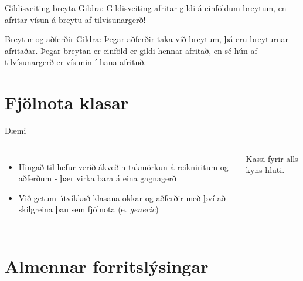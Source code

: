 \documentclass{beamer}
\begin{document}
\begin{frame}[fragile]{Gildisveiting breyta}
	Gildra: Gildisveiting afritar gildi á einföldum breytum, en afritar vísun á breytu af tilvísunargerð!

\end{frame}

\begin{frame}{Breytur og aðferðir}
	Gildra: Þegar aðferðir taka við breytum, þá eru breyturnar afritaðar. Þegar breytan er einföld er gildi hennar afritað, en sé hún af tilvísunargerð er vísunin í hana afrituð.

\end{frame}

\section{Fjölnota klasar}

\begin{frame}{Dæmi}
	\begin{columns}
		\begin{itemize}
			\item Hingað til hefur verið ákveðin takmörkun á reikniritum og aðferðum - þær virka bara á eina gagnagerð
			\item Við getum útvíkkað klasana okkar og aðferðir með því að skilgreina þau sem fjölnota (e. \emph{generic})
		\end{itemize}
		\begin{center}

			Kassi fyrir alls kyns hluti.
		\end{center}
	\end{columns}
\end{frame}

\section{Almennar forritslýsingar}
\end{document}
